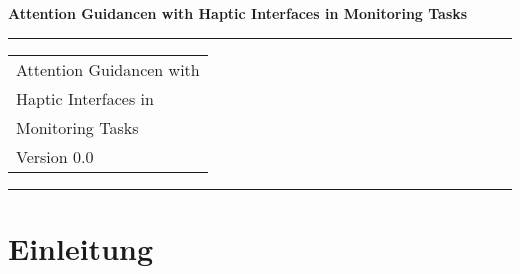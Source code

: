 \documentclass{llncs}
\begin{document}
\thispagestyle{empty}

\begin{flushleft}
\LARGE\bfseries Attention Guidancen with Haptic Interfaces in Monitoring Tasks\\
\end{flushleft}

\rule{\textwidth}{1pt}
\vspace{2pt}

\begin{flushright}
\Huge
\begin{tabular}{@{}l}
Attention Guidancen with\\
Haptic Interfaces in\\
Monitoring Tasks\\
{\Large Version 0.0}
\end{tabular}
\end{flushright}

\rule{\textwidth}{1pt}
\vfill

\newpage
\tableofcontents
\newpage

\newpage
\section{Einleitung}
\end{document}
